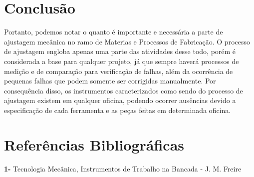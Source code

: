 \documentclass[
	12pt,				%
	oneside,			%
	a4paper,			%
	english,			%
	french,				%
	spanish,			%
	brazil,				%
	]{abntex2}
\begin{document}

\newpage
\section[Conclusão]{Conclusão}
\pagestyle{fancy}
Portanto, podemos notar o quanto é importante e necessária a parte de ajustagem mecânica no ramo de Materias e Processos de Fabricação. O processo de ajustagem engloba apenas uma parte das atividades desse todo, porém é considerada a base para qualquer projeto, já que sempre haverá processos de medição e de comparação para verificação de falhas, além da ocorrência de pequenas falhas que podem somente ser corrigidas manualmente. Por consequência disso, os instrumentos caracterizados como sendo do processo de ajustagem existem em qualquer oficina, podendo ocorrer ausências devido a especificação de cada ferramenta e as peças feitas em determinada oficina. 
\newpage
\section[Referências Bibliográficas]{Referências Bibliográficas}
\pagestyle{fancy}

\textbf{1-} Tecnologia Mecânica, Instrumentos de Trabalho na Bancada  - J. M. Freire
%
%
\end{document}
